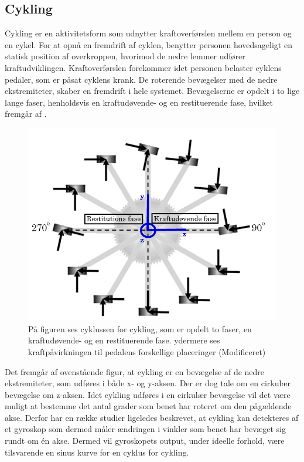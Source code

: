 \subsection{Cykling}
Cykling er en aktivitetsform som udnytter kraftoverførslen mellem en person og en cykel. For at opnå en fremdrift af cyklen, benytter personen hovedsageligt en statisk position af overkroppen, hvorimod de nedre lemmer udfører kraftudviklingen. \citep{Springer2014} \newline 
Kraftoverførslen forekommer idet personen belaster cyklens pedaler, som er påsat cyklens krank. De roterende bevægelser med de nedre ekstremiteter, skaber en fremdrift i hele systemet. Bevægelserne er opdelt i to lige lange faser, henholdsvis en kraftudøvende- og en restituerende fase, hvilket fremgår af .

\begin{figure}[H]
	\centering
	\includegraphics[scale=0.45]{figures/bProblemloesning/cykel_cyklus.png}
	\caption{På figuren ses cyklussen for cykling, som er opdelt to faser, en kraftudøvende- og en restituerende fase. ydermere ses kraftpåvirkningen til pedalens forskellige placeringer \citep{Springer2014} (Modificeret)}
	\label{fig:cykel_cyklus}
\end{figure}

Det fremgår af ovenstående figur, at cykling er en bevægelse af de nedre ekstremiteter, som udføres i både x- og y-aksen. Der er dog tale om en cirkulær bevægelse om z-aksen. \newline
Idet cykling udføres i en cirkulær bevægelse vil det være muligt at bestemme det antal grader som benet har roteret om den pågældende akse. Derfor har en række studier ligeledes beskrevet, at cykling kan detekteres af et gyroskop som dermed måler ændringen i vinkler som benet har bevæget sig rundt om én akse. Dermed vil gyroskopets output, under ideelle forhold, være tilsvarende en sinus kurve for en cyklus for cykling. \citep{Cockcroft2011,Marin-PerianuMarin-Perianu2013} 

